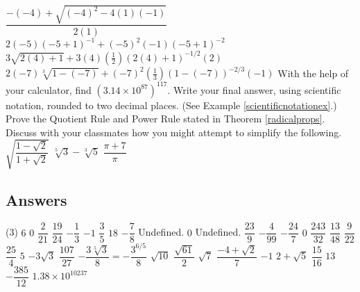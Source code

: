 \begin{tasks}
\task* $\dfrac{-(-4) + \sqrt{(-4)^2 - 4(1)(-1)}}{2(1)}$
\task* $2(-5)(-5+1)^{-1} + (-5)^2(-1)(-5+1)^{-2}$
\task* $3\sqrt{2(4)+1} + 3(4)\left(\frac{1}{2}\right)(2(4)+1)^{-1/2}(2)$
\task* $2(-7)\sqrt[3]{1-(-7)} + (-7)^2 \left(\frac{1}{3}\right)(1-(-7))^{-2/3}(-1)$ \label{arithexlast}
\task* With the help of your calculator, find $(3.14 \times 10^{87})^{117}$.  Write your final answer, using scientific notation, rounded to two decimal places. (See Example \ref{scientificnotationex}.)
\task* Prove the Quotient Rule and Power Rule stated in Theorem \ref{radicalprops}.
\task* Discuss with your classmates how you might attempt to simplify the following.
\task $\sqrt{\dfrac{1 - \sqrt{2}}{1 + \sqrt{2}}}$
\task $\sqrt[5]{3} - \sqrt[3]{5}$
\task $\dfrac{\pi + 7}{\pi}$
\end{tasks}

\clearpage

\subsection{Answers}

\begin{tasks}(3)
\task $6$
\task $0$
\task  $\dfrac{2}{21}$
\task  $\dfrac{19}{24}$
\task  $-\dfrac{1}{3}$
\task  $-1$
\task  $\dfrac{3}{5}$
\task  $18$
\task  $-\dfrac{7}{8}$
\task  Undefined.
\task  $0$
\task  Undefined.
\task  $\dfrac{23}{9}$
\task  $-\dfrac{4}{99}$
\task  $-\dfrac{24}{7}$
\task  $0$
\task  $\dfrac{243}{32}$
\task  $\dfrac{13}{48}$
\task  $\dfrac{9}{22}$
\task  $\dfrac{25}{4}$
\task  $5$ 
\task  $-3\sqrt{3}$ 
\task  $\dfrac{107}{27}$
\task  $-\dfrac{3\sqrt[5]{3}}{8} = -\dfrac{3^{6/5}}{8}$
\task  $\sqrt{10}$
\task  $\dfrac{\sqrt{61}}{2}$ 
\task  $\sqrt{7}$
\task  $\dfrac{-4 + \sqrt{2}}{7}$
\task  $-1$
\task  $2 + \sqrt{5}$
\task $\dfrac{15}{16}$
\task $13$
\task $-\dfrac{385}{12}$
\task $1.38 \times 10^{10237}$
\end{tasks}
